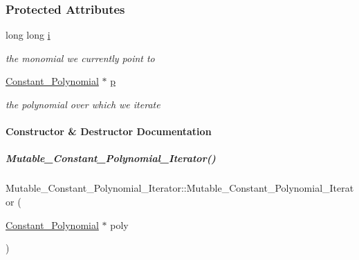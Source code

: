 \subsubsection*{Protected Attributes}
\begin{DoxyCompactItemize}
\item 
\mbox{\label{group___iterator_group_a7f2a05f25113363d7bb763d579aad653}} 
long long \hyperlink{group___iterator_group_a7f2a05f25113363d7bb763d579aad653}{i}
\begin{DoxyCompactList}\small\item\em the monomial we currently point to \end{DoxyCompactList}\item 
\mbox{\label{group___iterator_group_a9a9959010a5e8dc6cfdbef7c65ea26da}} 
\hyperlink{group__polygroup_class_constant___polynomial}{Constant\+\_\+\+Polynomial} $\ast$ \hyperlink{group___iterator_group_a9a9959010a5e8dc6cfdbef7c65ea26da}{p}
\begin{DoxyCompactList}\small\item\em the polynomial over which we iterate \end{DoxyCompactList}\end{DoxyCompactItemize}


\paragraph{Constructor \& Destructor Documentation}
\mbox{\label{group___iterator_group_ac443c5f24675fc7c8fb69bbd167b634b}} 
\subparagraph{\texorpdfstring{Mutable\+\_\+\+Constant\+\_\+\+Polynomial\+\_\+\+Iterator()}{Mutable\_Constant\_Polynomial\_Iterator()}}
{\footnotesize\ttfamily Mutable\+\_\+\+Constant\+\_\+\+Polynomial\+\_\+\+Iterator\+::\+Mutable\+\_\+\+Constant\+\_\+\+Polynomial\+\_\+\+Iterator (\begin{DoxyParamCaption}\item[{\hyperlink{group__polygroup_class_constant___polynomial}{Constant\+\_\+\+Polynomial} $\ast$}]{poly }\end{DoxyParamCaption})}



